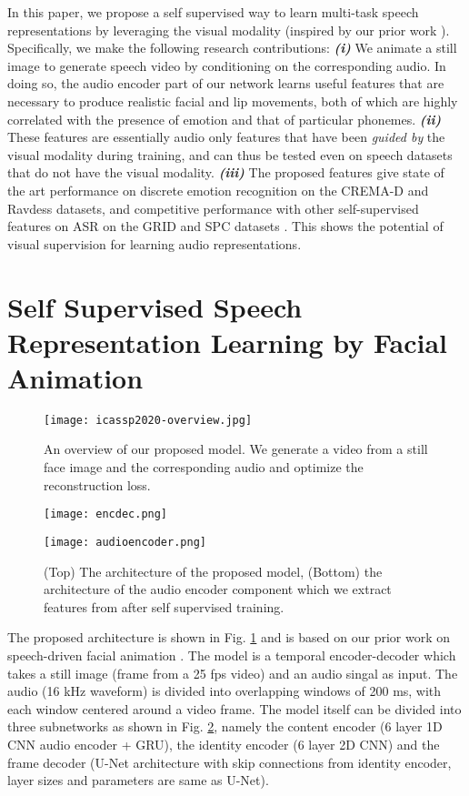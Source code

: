 \documentclass{article}
\begin{document}
In this paper, we propose a self supervised way to learn multi-task speech representations by leveraging the visual modality (inspired by our prior work \cite{vougioukas2018end}). Specifically, we make the following research contributions: \textbf{\textit{(i)}} We animate a still image to generate speech video by conditioning on the corresponding audio. In doing so, the audio encoder part of our network learns useful features that are necessary to produce realistic facial and lip movements, both of which are highly correlated with the presence of emotion and that of particular phonemes. \textbf{\textit{(ii)}} These features are essentially audio only features that have been \textit{guided by} the visual modality during training, and can thus be tested even on speech datasets that do not have the visual modality.  \textbf{\textit{(iii)}} The proposed features give state of the art performance  on discrete emotion recognition on the CREMA-D \cite{cao2014crema} and Ravdess \cite{livingstone2018ryerson} datasets, and competitive performance with other self-supervised features on ASR on the GRID \cite{cooke2006audio} and SPC datasets \cite{warden2018speech}. This shows the potential of visual supervision for learning audio representations.


\section{Self Supervised Speech Representation Learning by Facial Animation}
\label{sec:method}
\begin{figure}
    \centering
    \texttt{[image: icassp2020-overview.jpg]}
    \caption{An overview of our proposed model. We generate a video from a still face image and the corresponding audio and optimize the reconstruction loss.}
    \label{fig:overview}
\end{figure}
\begin{figure}[t]
    \centering
    \texttt{[image: encdec.png]} \\

    \vspace{0.2cm}

    \texttt{[image: audioencoder.png]}
    \caption{(Top) The architecture of the proposed model, (Bottom) the architecture of the audio encoder component which we extract features from after self supervised training.}
    \label{fig:generator}
\end{figure}

The proposed architecture is shown in Fig. \ref{fig:overview} and is based on our prior work on speech-driven facial animation \cite{vougioukas2018end}. The model is a temporal encoder-decoder which takes a still image (frame from a 25 fps video) and an audio singal as input. The audio (16 kHz waveform) is divided into overlapping windows of 200 ms, with each window centered around a video frame. The model itself can be divided into three subnetworks as shown in Fig. \ref{fig:generator}, namely the content encoder (6 layer 1D CNN audio encoder + GRU), the identity encoder (6 layer 2D CNN) and the frame decoder (U-Net \cite{ronneberger2015u} architecture with skip connections from identity encoder, layer sizes and parameters are same as U-Net).
\end{document}
